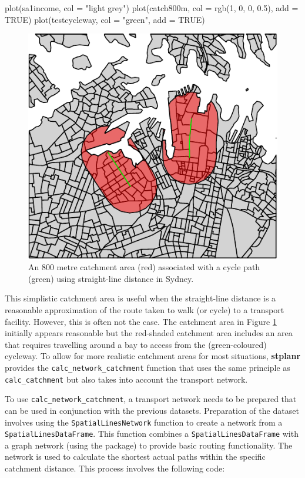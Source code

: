 \begin{Schunk}
\begin{Sinput}
plot(sa1income, col = "light grey")
plot(catch800m, col = rgb(1, 0, 0, 0.5), add = TRUE)
plot(testcycleway, col = "green", add = TRUE)
\end{Sinput}
\begin{figure}
\includegraphics{catchmentplot-1} \caption[An 800 metre catchment area (red) associated with a cycle path (green) using straight-line distance in Sydney]{An 800 metre catchment area (red) associated with a cycle path (green) using straight-line distance in Sydney.}\label{fig:catchmentplot}
\end{figure}
\end{Schunk}

This simplistic catchment area is useful when the straight-line distance
is a reasonable approximation of the route taken to walk (or cycle) to a
transport facility. However, this is often not the case. The catchment
area in Figure \ref{fig:catchmentplot} initially appears reasonable but
the red-shaded catchment area includes an area that requires travelling
around a bay to access from the (green-coloured) cycleway. To allow for
more realistic catchment areas for most situations, \textbf{stplanr}
provides the \texttt{calc\_network\_catchment} function that uses the
same principle as \texttt{calc\_catchment} but also takes into account
the transport network.

To use \texttt{calc\_network\_catchment}, a transport network needs to
be prepared that can be used in conjunction with the previous datasets.
Preparation of the dataset involves using the
\texttt{SpatialLinesNetwork} function to create a network from a
\texttt{SpatialLinesDataFrame}. This function combines a
\texttt{SpatialLinesDataFrame} with a graph network (using the
 package) to provide basic routing functionality. The
network is used to calculate the shortest actual paths within the
specific catchment distance. This process involves the following code:

